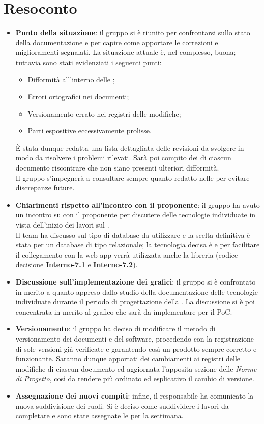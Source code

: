 \section{Resoconto}
\begin{itemize}
\item \textbf{Punto della situazione}: il gruppo si è riunito per confrontarsi sullo stato della documentazione e per capire come apportare le correzioni  e miglioramenti segnalati. La situazione attuale è, nel complesso, buona; tuttavia sono stati evidenziati i seguenti punti:
	\begin{itemize}
		\item Difformità all'interno delle ;
		\item Errori ortografici nei documenti;
		\item Versionamento errato nei registri delle modifiche;
		\item Parti espositive eccessivamente prolisse.
	\end{itemize} 
È stata dunque redatta una lista dettagliata delle revisioni da svolgere in modo da risolvere i problemi rilevati. Sarà poi compito dei  di ciascun documento riscontrare che non siano presenti ulteriori difformità. \\
Il gruppo s'impegnerà a consultare sempre quanto redatto nelle \NdP per evitare discrepanze future.

\item\textbf{Chiarimenti rispetto all'incontro con il proponente}: il gruppo ha avuto un incontro su  con il proponente per discutere delle tecnologie individuate in vista dell'inizio dei lavori sul \textit{}. \\ Il team ha discusso sul tipo di database da utilizzare e la scelta definitiva è stata per un database di tipo relazionale; la tecnologia decisa è \textit{} e per facilitare il collegamento con la web app verrà utilizzata anche la libreria \textit{} (codice decisione \textbf{Interno-7.1} e \textbf{Interno-7.2}).

\item\textbf{Discussione sull'implementazione dei grafici}: il gruppo si è confrontato in merito a quanto appreso dallo studio della documentazione delle tecnologie individuate durante il periodo di progettazione della . La discussione si è poi concentrata in merito al grafico che sarà da implementare per il PoC.

\item\textbf{Versionamento}: il gruppo ha deciso di modificare il metodo di versionamento dei documenti e del software, procedendo con la registrazione di sole versioni già verificate e garantendo così un prodotto sempre corretto e funzionante. Saranno dunque apportati dei cambiamenti ai registri delle modifiche di ciascun documento ed aggiornata l'apposita sezione delle \textit{Norme di Progetto}, così da rendere più ordinato ed esplicativo il cambio di versione.

\item \textbf{Assegnazione dei nuovi compiti}: infine, il responsabile ha comunicato la nuova suddivisione dei ruoli. Si è deciso come suddividere i lavori da completare e sono state assegnate le  per la settimana.
\end{itemize}

\newpage